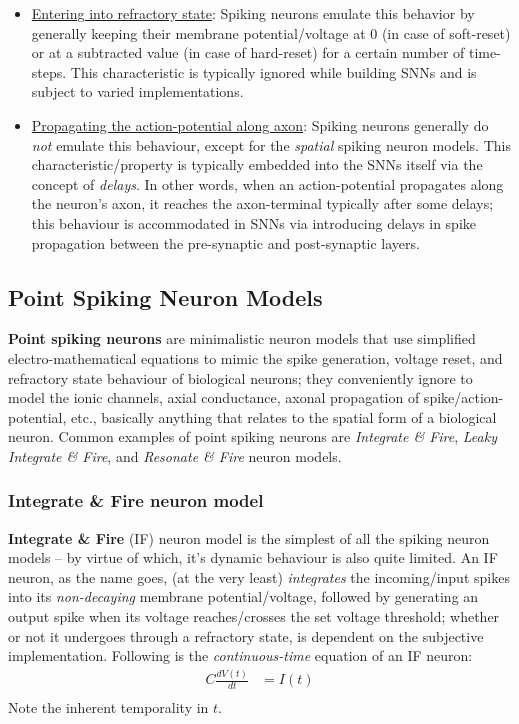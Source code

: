 \begin{itemize}
    \item \ul{Entering into refractory state}: Spiking neurons emulate this behavior by generally keeping their membrane potential/voltage at $0$ (in case of soft-reset) or at a subtracted value (in case of hard-reset) for a certain number of time-steps. This characteristic is typically ignored while building SNNs and is subject to varied implementations.
    \vspace{5pt}
    
    \item \ul{Propagating the action-potential along axon}: Spiking neurons generally do \textit{not} emulate this behaviour, except for the \textsl{spatial} spiking neuron models. This characteristic/property is typically embedded into the SNNs itself via the concept of \textit{delays}. In other words, when an action-potential propagates along the neuron's axon, it reaches the axon-terminal typically after some delays; this behaviour is accommodated in SNNs via introducing delays in spike propagation between the pre-synaptic and post-synaptic layers.
\end{itemize}

\subsection{Point Spiking Neuron Models}
\textbf{Point spiking neurons} are minimalistic neuron models that use simplified electro-mathematical equations to mimic the spike generation, voltage reset, and refractory state behaviour of biological neurons; they conveniently ignore to model the ionic channels, axial conductance, axonal propagation of spike/action-potential, etc., basically anything that relates to the spatial form of a biological neuron. Common examples of point spiking neurons are \textsl{Integrate \& Fire}, \textsl{Leaky Integrate \& Fire}, and \textsl{Resonate \& Fire} neuron models. 
\subsubsection{Integrate \& Fire neuron model}
\textbf{Integrate \& Fire} (IF) neuron model is the simplest of all the spiking neuron models -- by virtue of which, it's dynamic behaviour is also quite limited. An IF neuron, as the name goes, (at the very least) \textit{integrates} the incoming/input spikes into its \textit{non-decaying} membrane potential/voltage, followed by generating an output spike when its voltage reaches/crosses the set voltage threshold; whether or not it undergoes through a refractory state, is dependent on the subjective implementation. Following is the \textit{continuous-time} equation of an IF neuron: 
\begin{align}
C\frac{dV(t)}{dt} &= I(t) \\
\end{align}
Note the inherent temporality in $t$.

